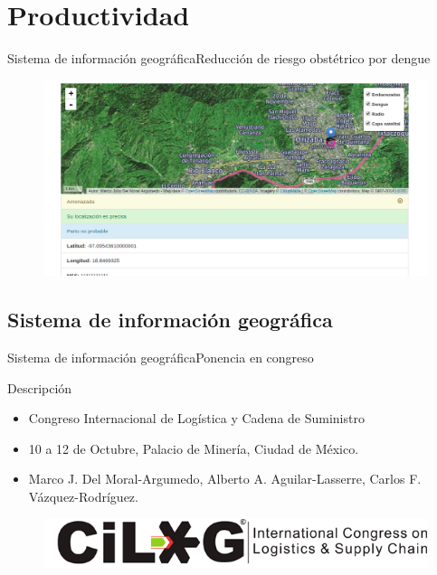 \documentclass{beamer}
\begin{document}
    \section{Productividad}
    \begin{frame}{Sistema de información geográfica}{Reducción de riesgo obstétrico por dengue}
        \begin{figure}[]
            \centering
            \includegraphics[width=\textwidth]{gis}
        \end{figure}
    \end{frame}
    \subsection{Sistema de información geográfica}
    \begin{frame}{Sistema de información geográfica}{Ponencia en congreso}
        \begin{block}{Descripción}{
            \begin{itemize}
                \item Congreso Internacional de Logística y Cadena de Suministro
                \item 10 a 12 de Octubre, Palacio de Minería, Ciudad de México.
                \item Marco J. Del Moral-Argumedo, Alberto A. Aguilar-Lasserre,
                Carlos F. Vázquez-Rodríguez.
            \end{itemize}
        }
        \end{block}
        \begin{figure}[]
            \centering
            \includegraphics[width=\textwidth]{cilog}
        \end{figure}
    \end{frame}
\end{document}
